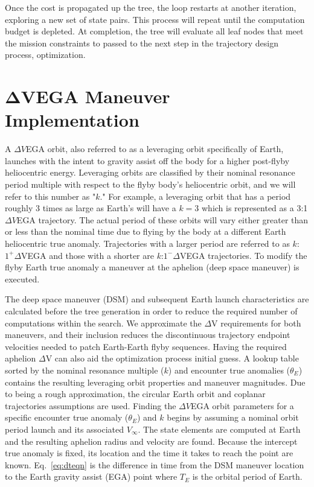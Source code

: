 \documentclass[letterpaper, preprint, paper,11pt]{AAS}	%
\begin{document}
Once the cost is propagated up the tree, the loop restarts at another iteration, exploring a new set of state pairs. This process will repeat until the computation budget is depleted. At completion, the tree will evaluate all leaf nodes that meet the mission constraints to passed to the next step in the trajectory design process, optimization.

\section{$\boldsymbol{\Delta V}$EGA Maneuver Implementation}

A $\Delta V$EGA orbit, also referred to as a leveraging orbit specifically of Earth, launches with the intent to gravity assist off the body for a higher post-flyby heliocentric energy\cite{Hollenbeck}.  Leveraging orbits are classified by their nominal resonance period multiple with respect to the flyby body's heliocentric orbit, and we will refer to this number as "$k$." For example, a leveraging orbit that has a period roughly 3 times as large as Earth's will have a $k=3$ which is represented as a 3:1 $\Delta V$EGA trajectory. The actual period of these orbits will vary either greater than or less than the nominal time due to flying by the body at a different Earth heliocentric true anomaly. Trajectories with a larger period are referred to as $k$:$1^{+} \Delta$VEGA and those with a shorter are $k$:$1^{-} \Delta$VEGA trajectories. To modify the flyby Earth true anomaly a maneuver at the aphelion (deep space maneuver) is executed.

The deep space maneuver (DSM) and subsequent Earth launch characteristics are calculated before the tree generation in order to reduce the required number of computations within the search. We approximate the $\Delta$V requirements for both maneuvers, and their inclusion reduces the discontinuous trajectory endpoint velocities needed to patch Earth-Earth flyby sequences. Having the required aphelion $\Delta$V can also aid the optimization process initial guess. A lookup table sorted by the nominal resonance multiple ($k$) and encounter true anomalies ($\theta_{E}$) contains the resulting leveraging orbit properties and maneuver magnitudes. Due to being a rough approximation, the circular Earth orbit and coplanar trajectories assumptions are used. Finding the $\Delta V$EGA orbit parameters for a specific encounter true anomaly ($\theta_{E}$) and $k$ begins by assuming a nominal orbit period launch and its associated $V_\infty$. The state elements are computed at Earth and the resulting aphelion radius and velocity are found. Because the intercept true anomaly is fixed, its location and the time it takes to reach the point are known. Eq.~\eqref{eq:dteqn} is the difference in time from the DSM maneuver location to the Earth gravity assist (EGA) point where $T_E$ is the orbital period of Earth.
\end{document}
